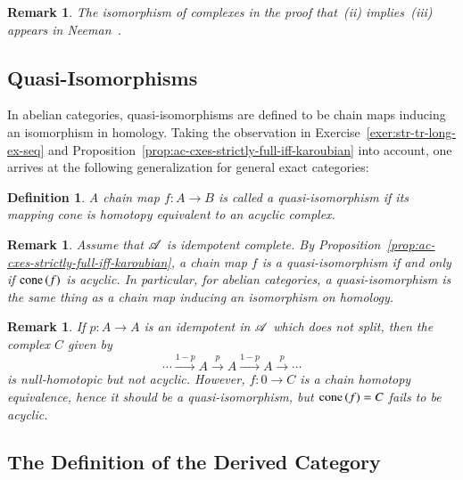 \documentclass[1p]{elsarticle}
\theoremstyle{mythm}
\theoremstyle{mydef}
\newtheorem{Rem}[Thm]{Remark}
\newtheorem{Def}[Thm]{Definition}
\begin{document}
\begin{Rem}
  The isomorphism of complexes in the proof that~(ii) implies~(iii)
  appears in Neeman~\cite[1.9]{MR1080854}.
\end{Rem}

\subsection{Quasi-Isomorphisms}
In abelian categories, quasi-isomorphisms are defined to be chain maps
inducing an isomorphism in homology. Taking the observation in
Exercise~\ref{exer:str-tr-long-ex-seq} and
Proposition~\ref{prop:ac-cxes-strictly-full-iff-karoubian} into
account, one arrives at the following generalization for general exact
categories:

\begin{Def}
  A chain map $f: A \to B$ is called a \emph{quasi-isomorphism} if its
  mapping cone is homotopy equivalent to an acyclic
  complex.
\end{Def}

\begin{Rem}
  Assume that $\operatorname{\mathscr{A}}$ is idempotent complete. 
  By Proposition~\ref{prop:ac-cxes-strictly-full-iff-karoubian}, a
  chain map $f$ is a quasi-isomorphism if and only if $\operatorname{cone}{(f)}$ is
  acyclic. In particular, for abelian categories, a
  quasi-isomorphism is the same thing as a chain map inducing an
  isomorphism on homology.
\end{Rem}

\begin{Rem}
  If $p: A \to A$ is an idempotent in $\operatorname{\mathscr{A}}$ which does not
  split, then the complex $C$ given by
  \[
  \cdots \xrightarrow{1-p} A \xrightarrow{p} A \xrightarrow{1-p} A
  \xrightarrow{p} \cdots
  \]
  is null-homotopic but 
  \emph{not} acyclic. However, $f:0 \to C$ is a chain homotopy equivalence,
  hence it should be a quasi-isomorphism, but $\operatorname{cone}{(f)} = C$ fails
  to be acyclic.
\end{Rem}



\subsection{The Definition of the Derived Category}
\end{document}
